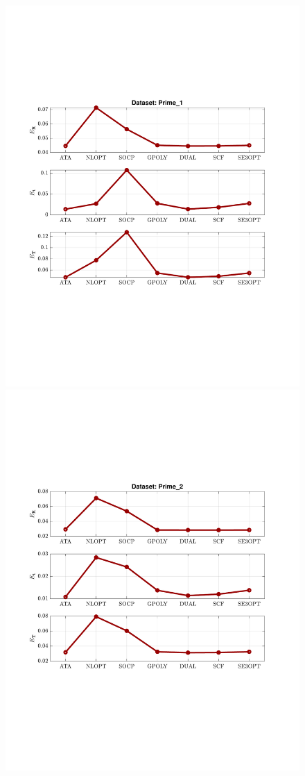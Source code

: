 \documentclass[a4paper]{report}
\begin{document}
\begin{figure}
\centering
\includegraphics[scale=0.7]{./hand_eye_figures/real/adv_Result_Prime_1}
\includegraphics[scale=0.7]{./hand_eye_figures/real/adv_Result_Prime_2}

\end{figure}
\end{document}
